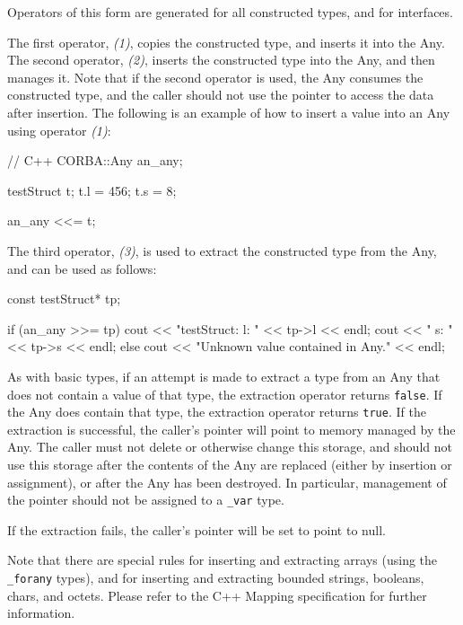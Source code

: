 \documentclass[11pt,twoside,a4paper]{book}
\newcommand{\type}[1]{\texttt{#1}}
\newcommand{\code}[1]{\texttt{#1}}
\begin{document}
Operators of this form are generated for all constructed types, and
for interfaces.

The first operator, \emph{(1)}, copies the constructed type, and
inserts it into the Any. The second operator, \emph{(2)}, inserts the
constructed type into the Any, and then manages it. Note that if the
second operator is used, the Any consumes the constructed type, and
the caller should not use the pointer to access the data after
insertion. The following is an example of how to insert a value into
an Any using operator \emph{(1)}:

\begin{cxxlisting}
// C++
CORBA::Any an_any;

testStruct t;
t.l = 456;
t.s = 8;

an_any <<= t;
\end{cxxlisting}


The third operator, \emph{(3)}, is used to extract the constructed
type from the Any, and can be used as follows:

\begin{cxxlisting}
const testStruct* tp;

if (an_any >>= tp) {
    cout << "testStruct: l: " << tp->l << endl;
    cout << "            s: " << tp->s << endl;
}
else {
    cout << "Unknown value contained in Any." << endl;
}
\end{cxxlisting}

As with basic types, if an attempt is made to extract a type from an
Any that does not contain a value of that type, the extraction
operator returns \code{false}. If the Any does contain that type, the
extraction operator returns \code{true}. If the extraction is
successful, the caller's pointer will point to memory managed by the
Any. The caller must not delete or otherwise change this storage, and
should not use this storage after the contents of the Any are replaced
(either by insertion or assignment), or after the Any has been
destroyed. In particular, management of the pointer should not be
assigned to a \type{\_var} type.

If the extraction fails, the caller's pointer will be set to point to
null.

Note that there are special rules for inserting and extracting arrays
(using the \type{\_forany} types), and for inserting and extracting
bounded strings, booleans, chars, and octets. Please refer to the C++
Mapping specification for further information.
\end{document}
